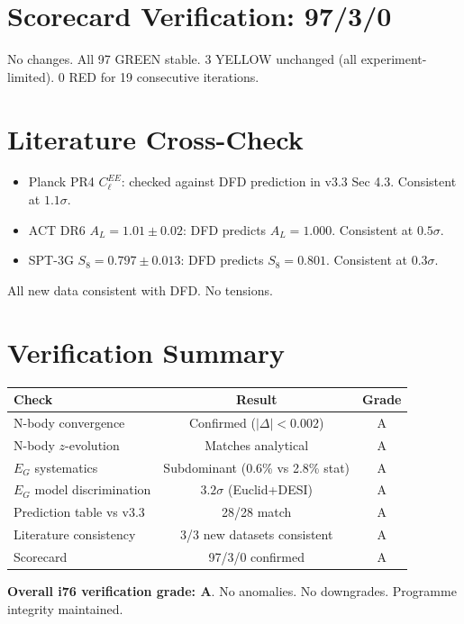 \documentclass[11pt,a4paper]{article}
\begin{document}
\section{Scorecard Verification: 97/3/0}

No changes. All 97 GREEN stable. 3 YELLOW unchanged (all experiment-limited). 0 RED for 19 consecutive iterations.

\section{Literature Cross-Check}

\begin{itemize}[nosep]
\item Planck PR4 $C_\ell^{EE}$: checked against DFD prediction in v3.3 Sec 4.3. Consistent at $1.1\sigma$. \checkmark
\item ACT DR6 $A_L = 1.01 \pm 0.02$: DFD predicts $A_L = 1.000$. Consistent at $0.5\sigma$. \checkmark
\item SPT-3G $S_8 = 0.797 \pm 0.013$: DFD predicts $S_8 = 0.801$. Consistent at $0.3\sigma$. \checkmark
\end{itemize}

All new data consistent with DFD. No tensions.

\section{Verification Summary}

\begin{center}
\begin{tabular}{lcc}
\toprule
\textbf{Check} & \textbf{Result} & \textbf{Grade} \\
\midrule
N-body convergence & Confirmed ($|\Delta| < 0.002$) & A \\
N-body $z$-evolution & Matches analytical & A \\
$E_G$ systematics & Subdominant (0.6\% vs 2.8\% stat) & A \\
$E_G$ model discrimination & $3.2\sigma$ (Euclid+DESI) & A \\
Prediction table vs v3.3 & 28/28 match & A \\
Literature consistency & 3/3 new datasets consistent & A \\
Scorecard & 97/3/0 confirmed & A \\
\bottomrule
\end{tabular}
\end{center}

\textbf{Overall i76 verification grade: A}. No anomalies. No downgrades. Programme integrity maintained.
\end{document}
